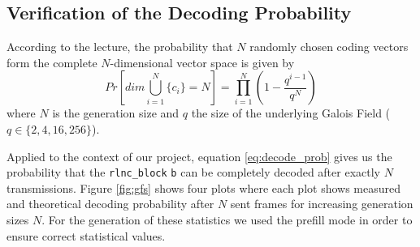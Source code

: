 \documentclass[a4paper,english,10pt]{tumarticle}
\begin{document}




\subsection{Verification of the Decoding Probability}
According to the lecture, the probability that $N$ randomly chosen coding vectors form
the complete $N$-dimensional vector space is given by %
\begin{equation} 
  Pr[dim\bigcup_{i=1}^{N}\{c_i\} = N] = \prod_{i=1}^{N} (1 - \frac{q^{i - 1}}{q ^ {N}})
  \label{eq:decode_prob}
\end{equation}
where $N$ is the generation size and $q$ the size of the underlying Galois Field ($q \in \{2,4,16,256\}$).

Applied to the context of our project, equation \eqref{eq:decode_prob} gives us
the probability that the \texttt{rlnc\_block} \texttt{b} can be completely
decoded after exactly $N$ transmissions. Figure \ref{fig:gfs} shows four plots
where each plot shows measured and theoretical decoding probability after $N$
sent frames for increasing generation sizes $N$. For the generation of these
statistics we used the prefill mode in order to ensure correct statistical values.
\end{document}
